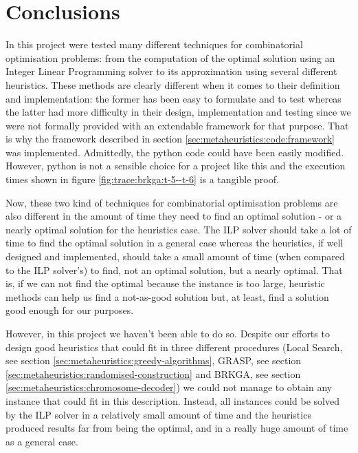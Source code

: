 \section{Conclusions}

In this project were tested many different techniques for combinatorial optimisation problems:
from the computation of the optimal solution using an Integer Linear Programming solver to its
approximation using several different heuristics. These methods are clearly different when it
comes to their definition and implementation: the former has been easy to formulate and to test
whereas the latter had more difficulty in their design, implementation and testing since we were
not formally provided with an extendable framework for that purpose. That is why the framework
described in section \ref{sec:metaheuristics:code:framework} was implemented. Admittedly, the
python code could have been easily modified. However, python is not a sensible choice for a
project like this and the execution times shown in figure \ref{fig:trace:brkga:t-5--t-6} is a
tangible proof.

\hfill

Now, these two kind of techniques for combinatorial optimisation problems are also different in
the amount of time they need to find an optimal solution - or a nearly optimal solution for the
heuristics case. The ILP solver should take a lot of time to find the optimal solution in a
general case whereas the heuristics, if well designed and implemented, should take a small
amount of time (when compared to the ILP solver's) to find, not an optimal solution, but a
nearly optimal. That is, if we can not find the optimal because the instance is too large,
heuristic methods can help us find a not-as-good solution but, at least, find a solution good
enough for our purposes.

\hfill

However, in this project we haven't been able to do so. Despite our efforts to design good
heuristics that could fit in three different procedures (Local Search, see section
\ref{sec:metaheuristics:greedy-algorithms}, GRASP, see section
\ref{sec:metaheuristics:randomised-construction} and BRKGA, see section
\ref{sec:metaheuristics:chromosome-decoder}) we could not manage to obtain any instance that
could fit in this description. Instead, all instances could be solved by the ILP solver in a
relatively small amount of time and the heuristics produced results far from being the optimal,
and in a really huge amount of time as a general case.

